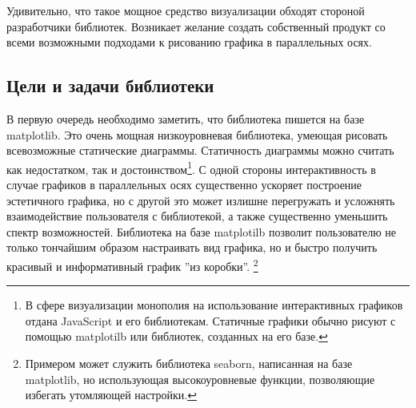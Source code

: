 \documentclass[12pt,fleqn]{article}
\begin{document}
Удивительно, что такое мощное средство визуализации обходят стороной разработчики библиотек. 
Возникает желание создать собственный продукт со всеми возможными подходами к рисованию графика 
в параллельных осях.
\subsection{Цели и задачи библиотеки}
В первую очередь необходимо заметить, что библиотека пишется на базе 
matplotlib. Это очень мощная низкоуровневая библиотека, умеющая рисовать всевозможные 
статические диаграммы. Статичность диаграммы можно считать как недостатком, так и достоинством\footnote{
    В сфере визуализации монополия на использование интерактивных графиков отдана JavaScript и
его библиотекам. Статичные графики обычно рисуют с помощью matplotilb или библиотек, созданных на его базе.}. 
С одной стороны интерактивность в случае графиков в параллельных осях существенно ускоряет построение
эстетичного графика, но с другой это может излишне перегружать и усложнять взаимодействие
пользователя с библиотекой, а также существенно уменьшить спектр возможностей. Библиотека на базе 
matplotilb позволит пользователю не только тончайшим образом настраивать вид графика, но и быстро
получить красивый и информативный график ''из коробки''.
\footnote{Примером может служить библиотека seaborn, написанная на базе matplotlib, но
использующая высокоуровневые функции, позволяющие избегать утомляющей настройки.}
\end{document}
